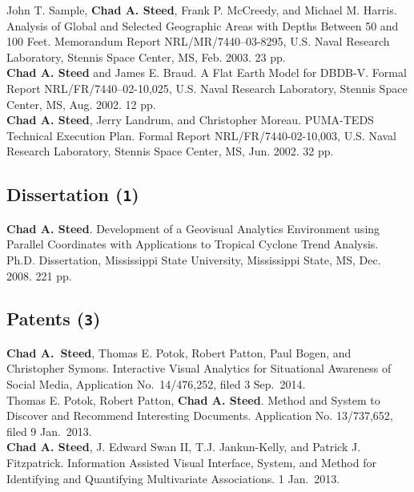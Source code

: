 \documentclass[11pt, letterpaper]{article}
\newcommand{\years}[1]{\marginnote{\scriptsize #1}}
\begin{document}
\begin{sloppypar}
\years{2003}John T. Sample, \textbf{Chad A. Steed}, Frank P. McCreedy, and
Michael M. Harris. Analysis of Global and Selected Geographic Areas with
Depths Between 50 and 100 Feet. Memorandum Report NRL/MR/7440–03-8295, U.S.
Naval Research Laboratory, Stennis Space Center, MS, Feb. 2003. 23 pp.\\
\years{2002}\textbf{Chad A. Steed} and James E. Braud. A Flat Earth Model for
DBDB-V. Formal Report NRL/FR/7440–02-10,025, U.S. Naval Research Laboratory,
Stennis Space Center, MS, Aug. 2002. 12 pp.\\
\years{2002}\textbf{Chad A. Steed}, Jerry Landrum, and Christopher Moreau.
PUMA-TEDS Technical Execution Plan. Formal Report NRL/FR/7440-02-10,003, U.S.
Naval Research Laboratory, Stennis Space Center, MS, Jun. 2002. 32 pp.
\end{sloppypar}

\subsection*{Dissertation (\texttt{1})}
\noindent\years{2008}\textbf{Chad A. Steed}. Development of a Geovisual
Analytics Environment using Parallel Coordinates with Applications to
Tropical Cyclone Trend Analysis. Ph.D. Dissertation, Mississippi State
University, Mississippi State, MS, Dec. 2008. 221 pp.

\subsection*{Patents (\texttt{3})}
\noindent\years{2014}\textbf{Chad A.\ Steed}, Thomas E. Potok, Robert Patton,
Paul Bogen, and Christopher Symons. Interactive Visual Analytics for Situational
Awareness of Social Media, Application No.\ 14/476,252, filed 3 Sep.\ 2014.\\
\years{2013}Thomas E. Potok, Robert Patton, \textbf{Chad A. Steed}.
Method and System to Discover and Recommend Interesting Documents.
Application No. 13/737,652, filed 9 Jan.\ 2013.\\
\years{2013}\textbf{Chad A. Steed}, J. Edward Swan II, T.J. Jankun-Kelly, and
Patrick J. Fitzpatrick. Information Assisted Visual Interface, System, and
Method for Identifying and Quantifying Multivariate Associations. 1 Jan.\ 2013.

\end{document}
